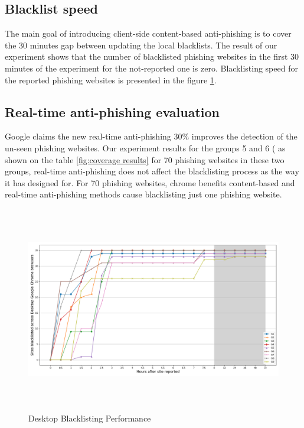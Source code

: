 \subsection{Blacklist speed}
The main goal of introducing client-side content-based anti-phishing is to cover the 30 minutes gap between updating the local blacklists. The result of our experiment shows that the number of blacklisted phishing websites in the first 30 minutes of the experiment for the not-reported one is zero.
Blacklisting speed for the reported phishing websites is presented in the figure \ref{Blacklisting speed results}. 

\subsection{Real-time anti-phishing evaluation}

Google claims the new real-time anti-phishing 30\%  improves the detection of the un-seen phishing websites. Our experiment results for the groups 5 and 6 ( as shown on the table \ref{fig:coverage results} for 70 phishing websites in these two groups, real-time anti-phishing does not affect the blacklisting process as the way it has designed for. For 70 phishing websites, chrome benefits content-based and real-time anti-phishing methods cause blacklisting just one phishing website.

\begin{figure}[t]
  \includegraphics[width=\textwidth,height=9cm]{figures/DesktopBlacklistSpeed.png}
  \caption{Desktop Blacklisting Performance}
  \label{Blacklisting speed results}
\end{figure}


